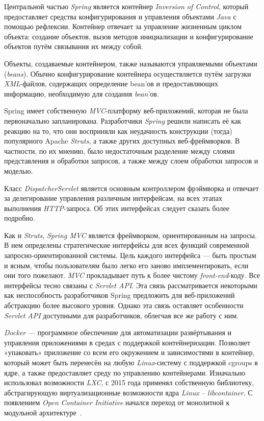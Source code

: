 Центральной частью \textit{Spring} является контейнер \textit{Inversion of Control}, который предоставляет средства конфигурирования и управления объектами \textit{Java} с помощью рефлексии. Контейнер отвечает за управление жизненным циклом объекта: создание объектов, вызов методов инициализации и конфигурирование объектов путём связывания их между собой.

Объекты, создаваемые контейнером, также называются управляемыми объектами (\textit{beans}). Обычно конфигурирование контейнера осуществляется путём загрузки \textit{XML}-файлов, содержащих определение bean’ов и предоставляющих информацию, необходимую для создания \textit{bean}’ов.

Spring имеет собственную \textit{MVC}-платформу веб-приложений, которая не была первоначально запланирована. Разработчики \textit{Spring} решили написать её как реакцию на то, что они восприняли как неудачность конструкции (тогда) популярного Apache \textit{Struts}, а также других доступных веб-фреймворков. В частности, по их мнению, было недостаточным разделение между слоями представления и обработки запросов, а также между слоем обработки запросов и моделью.

Класс \textit{DispatcherServlet} является основным контроллером фрэймворка и отвечает за делегирование управления различным интерфейсам, на всех этапах выполнения \textit{HTTP}-запроса. Об этих интерфейсах следует сказать более подробно.

Как и \textit{Struts}, \textit{Spring MVC} является фреймворком, ориентированным на запросы. В нем определены стратегические интерфейсы для всех функций современной запросно-ориентированной системы. Цель каждого интерфейса — быть простым и ясным, чтобы пользователям было легко его заново имплементировать, если они того пожелают. \textit{MVC} прокладывает путь к более чистому \textit{front-end}-коду. Все интерфейсы тесно связаны с \textit{Servlet API}. Эта связь рассматривается некоторыми как неспособность разработчиков Spring предложить для веб-приложений абстракцию более высокого уровня. Однако эта связь оставляет особенности \textit{Servlet API} доступными для разработчиков, облегчая все же работу с ним. 

\textit{Docker} — программное обеспечение для автоматизации развёртывания и управления приложениями в средах с поддержкой контейнеризации. Позволяет «упаковать» приложение со всем его окружением и зависимостями в контейнер, который может быть перенесён на любую \textit{Linux}-систему с поддержкой cgroups в ядре, а также предоставляет среду по управлению контейнерами. Изначально использовал возможности \textit{LXC}, с 2015 года применял собственную библиотеку, абстрагирующую виртуализационные возможности ядра \textit{Linux} -- \textit{libcontainer}. С появлением \textit{​Open Container Initiative} начался переход от монолитной к модульной архитектуре~\cite{docker}.

